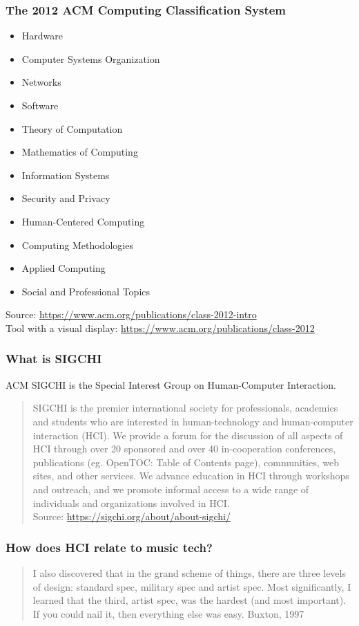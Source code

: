 \documentclass[screen, aspectratio=43]{beamer}
\begin{document}
\begin{frame}
\frametitle{The 2012 ACM Computing Classification System}
\begin{itemize}
\item Hardware
\item Computer Systems Organization
\item Networks
\item Software
\item Theory of Computation
\item Mathematics of Computing
\item Information Systems
\item Security and Privacy
\item Human-Centered Computing
\item Computing Methodologies
\item Applied Computing
\item Social and Professional Topics
\end{itemize}
Source: \url{https://www.acm.org/publications/class-2012-intro}\\
Tool with a visual display: \url{https://www.acm.org/publications/class-2012}
\end{frame}
%
\begin{frame}
\frametitle{What is SIGCHI}
ACM SIGCHI is the Special Interest Group  on Human-Computer Interaction.
\begin{quote}
SIGCHI is the premier international society for professionals, academics and students who are interested in human-technology and human-computer interaction (HCI). We provide a forum for the discussion of all aspects of HCI through over 20 sponsored and over 40 in-cooperation conferences, publications (eg. OpenTOC: Table of Contents page), communities, web sites, and other services. We advance education in HCI through workshops and outreach, and we promote informal access to a wide range of individuals and organizations involved in HCI.\\ 
Source: \url{https://sigchi.org/about/about-sigchi/}
\end{quote}
\end{frame}
%
\begin{frame}
\frametitle{How does HCI relate to music tech?}
\begin{quote}
I also discovered that in the grand scheme of things, there are three
levels of design: standard spec, military spec and artist spec. Most significantly,
I learned that the third, artist spec, was the hardest (and most
important). If you could nail it, then everything else was easy. Buxton, 1997 ~\cite{Buxton.1997}
\end{quote}
\end{frame}
\end{document}
